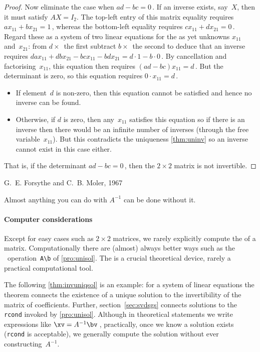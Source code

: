 \begin{proof}
Now eliminate the case when \(ad-bc=0\)\,.
If an inverse exists, say~\(X\), then it must satisfy \(AX=I_2\).
The top-left entry of this matrix equality requires \(ax_{11}+bx_{21}=1\)\,, whereas the bottom-left equality requires \(cx_{11}+dx_{21}=0\)\,.
Regard these as a system of two linear equations for the as yet unknowns \(x_{11}\) and~\(x_{21}\): from \(d\times\)~the first subtract \(b\times\)~the second to deduce that an inverse requires
\(dax_{11}+dbx_{21}-bcx_{11}-bdx_{21}=d\cdot1-b\cdot0\)\,.
By cancellation and factorising~\(x_{11}\), this equation then requires \((ad-bc)x_{11}=d\)\,.
But the determinant is zero, so this equation requires \(0\cdot x_{11}=d\)\,.
\begin{itemize}
\item If element~\(d\) is non-zero, then this equation cannot be satisfied and hence no inverse can be found.
\item Otherwise, if \(d\) is zero, then any~\(x_{11}\) satisfies this equation so if there is an inverse then there would be an infinite number of inverses (through the free variable~\(x_{11}\)).
But this contradicts the uniqueness \autoref{thm:uninv} so an inverse cannot exist in this case either.
\end{itemize}
That is, if the determinant \(ad-bc=0\)\,, then the \(2\times2\) matrix is not invertible.
\end{proof}



\begin{quoted}{\parbox[t]{0.5\linewidth}{G.~E. Forsythe and C.~B. Moler, 1967 \cite[p.261]{Higham1996}}}
Almost anything you can do with \(A^{-1}\) can be done without it.
\end{quoted}


\paragraph{Computer considerations} 
Except for easy cases such as \(2\times2\) matrices, we rarely explicitly compute the  of a matrix.
Computationally there are (almost) always better ways such as the \script\ operation~\verb|A\b| of \autoref{pro:unisol}.
The  is a crucial theoretical device, rarely a practical computational tool.


The following \autoref{thm:invuniqsol} is an example: for a system of linear equations the theorem connects the existence of a unique solution to the invertibility of the matrix of coefficients.
Further, section~\ref{sec:svdsgs} connects solutions to the \verb|rcond| invoked by \autoref{pro:unisol}.
Although in theoretical statements we write expressions like \(\xv=A^{-1}\bv\)\,,
practically, once we know a solution exists (\verb|rcond| is acceptable), we generally compute the solution without ever constructing~\(A^{-1}\).



